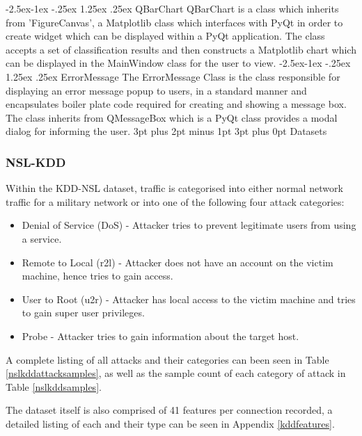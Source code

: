 \documentclass[12pt,a4paper]{article}
\makeatletter
\renewcommand\paragraph{\@startsection{paragraph}{4}{\z@}%
  {-2.5ex\@plus -1ex \@minus -.25ex}%
  {1.25ex \@plus .25ex}%
  {\normalfont\normalsize\bfseries}}
\renewcommand\subsection{\@startsection {subsection}{1}{2mm} %
      {3pt plus 2pt minus 1pt} %
      {3pt plus 0pt} %
      {\normalfont\bfseries}}
\makeatother
\begin{document}
\paragraph{QBarChart}
QBarChart is a class which inherits from 'FigureCanvas', a Matplotlib class which interfaces with PyQt in order to create widget which can be displayed within a PyQt application. The class accepts a set of classification results and then constructs a Matplotlib chart which can be displayed in the MainWindow class for the user to view.
\paragraph{ErrorMessage}
The ErrorMessage Class is the class responsible for displaying an error message popup to users, in a standard manner and encapsulates boiler plate code required for creating and showing a message box. The class inherits from QMessageBox which is a PyQt class provides a modal dialog for informing the user.
\subsection{Datasets}
\subsubsection{NSL-KDD}
Within the KDD-NSL dataset, traffic is categorised into either normal network traffic for a military network or into one of the following four attack categories:
\begin{itemize}
\item{Denial of Service (DoS) - Attacker tries to prevent legitimate users from using a service.}
\item{Remote to Local (r2l) - Attacker does not have an account on the victim machine, hence tries to gain access.}
\item{User to Root (u2r) - Attacker has local access to the victim machine and tries to gain super user privileges.}
\item{Probe - Attacker tries to gain information about the target host.}
\end{itemize}
A complete listing of all attacks and their categories can been seen in Table \ref{nslkddattacksamples}, as well as the sample count of each category of attack in Table \ref{nslkddsamples}.



The dataset itself is also comprised of 41 features per connection recorded, a detailed listing of each and their type can be seen in Appendix \ref{kddfeatures}.
\end{document}

